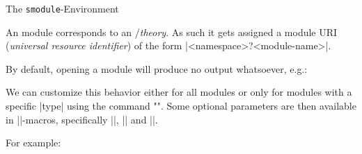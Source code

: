 \begin{sfragment}{The \texttt{smodule}-Environment}
    \begin{mmtbox}
        An \sTeX module corresponds to an \mmt/\omdoc \emph{theory}.
        As such it gets assigned a module URI (\emph{universal resource identifier})
        of the form |<namespace>?<module-name>|.
    \end{mmtbox}

    By default, opening a module will produce no output whatsoever,
    e.g.:

    \begin{function}{\stexpatchmodule}
        We can customize this behavior either for all modules or
        only for modules with a specific |type| using the command
        \stexcode"".
        Some optional parameters are then available in |\smodule*|-macros,
        specifically |\smoduletitle|, |\smoduletype| and |\smoduleid|.
    \end{function}
        For example:

\end{sfragment}


